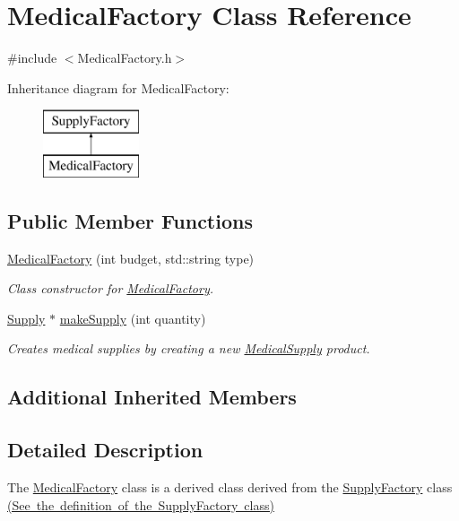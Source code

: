 \hypertarget{class_medical_factory}{}\section{Medical\+Factory Class Reference}
\label{class_medical_factory}


{\ttfamily \#include $<$Medical\+Factory.\+h$>$}

Inheritance diagram for Medical\+Factory\+:\begin{figure}[H]
\begin{center}
\leavevmode
\includegraphics[height=2.000000cm]{class_medical_factory}
\end{center}
\end{figure}
\subsection*{Public Member Functions}
\begin{DoxyCompactItemize}
\item 
\mbox{\hyperlink{class_medical_factory_a4f870a142a0af80b8ae7beffed25c436}{Medical\+Factory}} (int budget, std\+::string type)
\begin{DoxyCompactList}\small\item\em Class constructor for \mbox{\hyperlink{class_medical_factory}{Medical\+Factory}}. \end{DoxyCompactList}\item 
\mbox{\hyperlink{class_supply}{Supply}} $\ast$ \mbox{\hyperlink{class_medical_factory_a323b36eb230b6b4e261dd2fed1164d5c}{make\+Supply}} (int quantity)
\begin{DoxyCompactList}\small\item\em Creates medical supplies by creating a new \mbox{\hyperlink{class_medical_supply}{Medical\+Supply}} product. \end{DoxyCompactList}\end{DoxyCompactItemize}
\subsection*{Additional Inherited Members}


\subsection{Detailed Description}
The \mbox{\hyperlink{class_medical_factory}{Medical\+Factory}} class is a derived class derived from the \mbox{\hyperlink{class_supply_factory}{Supply\+Factory}} class \mbox{\hyperlink{_supply_factory_8h_source}{(See the definition of the Supply\+Factory class)}}

